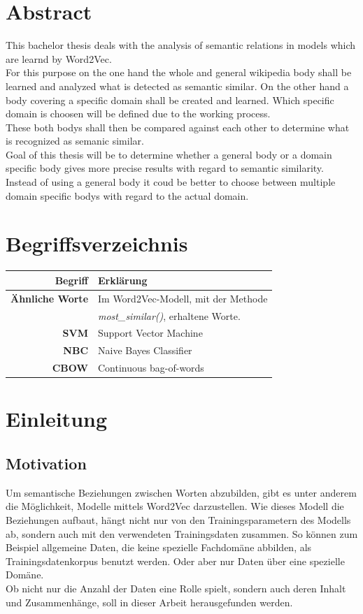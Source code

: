 \documentclass[12pt,a4paper]{report}
\begin{document}
\chapter*{Abstract}
This bachelor thesis deals with the analysis of semantic relations in models which are learnd by Word2Vec.\\
For this purpose on the one hand the whole and general wikipedia body shall be learned and analyzed what is detected as semantic similar. On the other hand a body covering a specific domain shall be created and learned. Which specific domain is choosen will be defined due to the working process.\\
These both bodys shall then be compared against each other to determine what is recognized as semanic similar.\\
Goal of this thesis will be to determine whether a general body or a domain specific body gives more precise results with regard to semantic similarity. Instead of using a general body it coud be better to choose between multiple domain specific bodys with regard to the actual domain.

\newpage
\tableofcontents
\newpage
\chapter*{Begriffsverzeichnis}
	\begin{tabular}{r|l}	
	\textbf{Begriff} & Erklärung\\
	\hline	
	\textbf{Ähnliche Worte} & Im Word2Vec-Modell, mit der Methode\\
	& \textit{most\_similar()}, erhaltene Worte.\\
	\textbf{SVM} & Support Vector Machine\\
	\textbf{NBC} & Naive Bayes Classifier\\
	\textbf{CBOW} & Continuous bag-of-words\\

\end{tabular}
\newpage
{}
\chapter{Einleitung}
	\section{Motivation}
	  
	
	Um semantische Beziehungen zwischen Worten abzubilden, gibt es unter anderem die Möglichkeit, Modelle mittels Word2Vec darzustellen. Wie dieses Modell die Beziehungen aufbaut, hängt nicht nur von den Trainingsparametern des Modells ab, sondern auch mit den verwendeten Trainingsdaten zusammen. So können zum Beispiel allgemeine Daten, die keine spezielle Fachdomäne abbilden, als Trainingsdatenkorpus benutzt werden. Oder aber nur Daten über eine spezielle Domäne. \\	
	Ob nicht nur die Anzahl der Daten eine Rolle spielt, sondern auch deren Inhalt und Zusammenhänge, soll in dieser Arbeit herausgefunden werden. 
\end{document}
